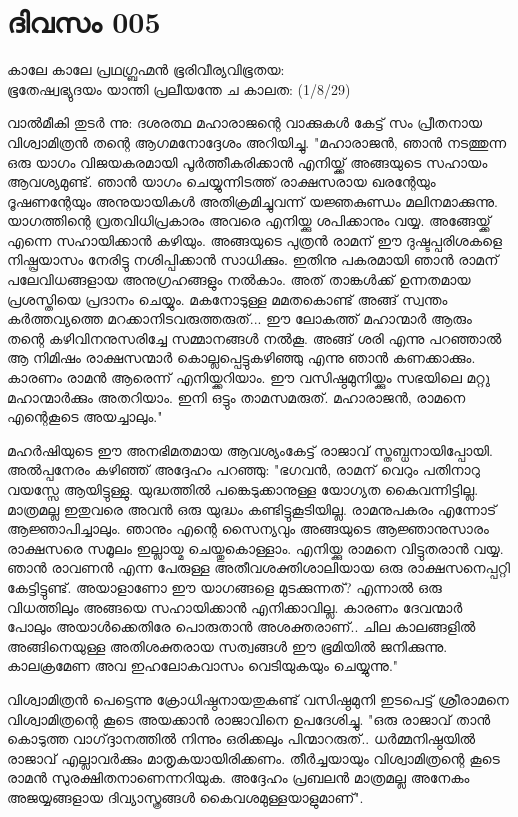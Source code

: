  
\section{ദിവസം 005}

\begin{center}
കാലേ കാലേ പ്രഥഗ്ബ്രഹ്മൻ ഭൂരിവീര്യവിഭൂതയ:\\
ഭൂതേഷ്വഭ്യുദയം യാന്തി പ്രലീയന്തേ ച കാലത:  (1/8/29)\\
\end{center}

വാല്‍മീകി തുടര്‍ ന്നു: ദശരത്ഥ മഹാരാജന്റെ വാക്കുകള്‍ കേട്ട്‌ സം പ്രീതനായ വിശ്വാമിത്രന്‍ തന്റെ ആഗമനോദ്ദേശം അറിയിച്ചു. "മഹാരാജന്‍, ഞാന്‍ നടത്തുന്ന ഒരു യാഗം വിജയകരമായി പൂര്‍ത്തീകരിക്കാന്‍ എനിയ്ക്ക്‌ അങ്ങയുടെ സഹായം ആവശ്യമുണ്ട്‌. ഞാന്‍ യാഗം ചെയ്യുന്നിടത്ത്‌ രാക്ഷസരായ ഖരന്റേയും ദൂഷണന്റേയും അനുയായികള്‍ അതിക്രമിച്ചുവന്ന് യജ്ഞകുണ്ഡം മലിനമാക്കുന്നു. യാഗത്തിന്റെ വ്രതവിധിപ്രകാരം അവരെ എനിയ്ക്കു ശപിക്കാനും വയ്യ. അങ്ങേയ്ക്ക്‌ എന്നെ സഹായിക്കാന്‍ കഴിയും. അങ്ങയുടെ പുത്രന്‍ രാമന്‌ ഈ ദുഷ്ടപ്പരിശകളെ നിഷ്പ്രയാസം നേരിട്ടു നശിപ്പിക്കാന്‍ സാധിക്കും. ഇതിനു പകരമായി ഞാന്‍ രാമന്‌ പലേവിധങ്ങളായ അനുഗ്രഹങ്ങളും നല്‍കാം. അത്‌ താങ്കള്‍ക്ക്‌ ഉന്നതമായ പ്രശസ്തിയെ പ്രദാനം ചെയ്യും. മകനോടുള്ള മമതകൊണ്ട്‌ അങ്ങ്‌ സ്വന്തം കര്‍ത്തവ്യത്തെ മറക്കാനിടവരുത്തരുത്‌... ഈ ലോകത്ത്‌ മഹാന്മാര്‍ ആരും തന്റെ കഴിവിനനുസരിച്ചേ സമ്മാനങ്ങള്‍ നല്‍കൂ. അങ്ങ്‌ ശരി എന്നു പറഞ്ഞാല്‍ ആ നിമിഷം രാക്ഷസന്മാര്‍ കൊല്ലപ്പെട്ടുകഴിഞ്ഞു എന്നു ഞാന്‍ കണക്കാക്കും. കാരണം രാമന്‍ ആരെന്ന് എനിയ്ക്കറിയാം. ഈ വസിഷ്ഠമുനിയ്ക്കും സഭയിലെ മറ്റു മഹാന്മാര്‍ക്കും അതറിയാം. ഇനി ഒട്ടും താമസമരുത്‌. മഹാരാജന്‍, രാമനെ എന്റെകൂടെ അയച്ചാലും."

മഹര്‍ഷിയുടെ ഈ അനഭിമതമായ ആവശ്യംകേട്ട്‌ രാജാവ്‌ സ്തബ്ധനായിപ്പോയി. അല്‍പ്പനേരം കഴിഞ്ഞ്‌ അദ്ദേഹം പറഞ്ഞു: "ഭഗവന്‍, രാമന്‌ വെറും പതിനാറു വയസ്സേ ആയിട്ടുള്ളു. യുദ്ധത്തില്‍ പങ്കെടുക്കാനുള്ള യോഗ്യത കൈവന്നിട്ടില്ല. മാത്രമല്ല ഇതുവരെ അവന്‍ ഒരു യുദ്ധം കണ്ടിട്ടുകൂടിയില്ല. രാമനുപകരം എന്നോട്‌ ആജ്ഞാപിച്ചാലും. ഞാനും എന്റെ സൈന്യവും അങ്ങയുടെ ആജ്ഞാനുസാരം രാക്ഷസരെ സമൂലം ഇല്ലായ്മ ചെയ്തുകൊള്ളാം. എനിയ്ക്കു രാമനെ വിട്ടുതരാന്‍ വയ്യ. ഞാന്‍ രാവണന്‍ എന്ന പേരുള്ള അതീവശക്തിശാലിയായ ഒരു രാക്ഷസനെപ്പറ്റി കേട്ടിട്ടുണ്ട്‌. അയാളാണോ ഈ യാഗങ്ങളെ മുടക്കുന്നത്‌? എന്നാല്‍ ഒരു വിധത്തിലും അങ്ങയെ സഹായിക്കാന്‍ എനിക്കാവില്ല. കാരണം ദേവന്മാര്‍ പോലും അയാള്‍ക്കെതിരേ പൊരുതാന്‍ അശക്തരാണ്‌.. ചില കാലങ്ങളില്‍ അങ്ങിനെയുള്ള അതിശക്തരായ സത്വങ്ങള്‍ ഈ ഭൂമിയില്‍ ജനിക്കുന്നു. കാലക്രമേണ അവ ഇഹലോകവാസം വെടിയുകയും ചെയ്യുന്നു."

വിശ്വാമിത്രന്‍ പെട്ടെന്നു ക്രോധിഷ്ഠനായതുകണ്ട്‌ വസിഷ്ഠമുനി ഇടപെട്ട്‌ ശ്രീരാമനെ വിശ്വാമിത്രന്റെ കൂടെ അയക്കാന്‍ രാജാവിനെ ഉപദേശിച്ചു. "ഒരു രാജാവ്‌ താന്‍ കൊടുത്ത വാഗ്ദ്ദാനത്തില്‍ നിന്നും ഒരിക്കലും പിന്മാറരുത്‌.. ധര്‍മ്മനിഷ്ഠയില്‍ രാജാവ്‌ എല്ലാവര്‍ക്കും മാതൃകയായിരിക്കണം. തീര്‍ച്ചയായും വിശ്വാമിത്രന്റെ കൂടെ രാമന്‍ സുരക്ഷിതനാണെന്നറിയുക. അദ്ദേഹം പ്രബലന്‍ മാത്രമല്ല അനേകം അജയ്യങ്ങളായ ദിവ്യാസ്ത്രങ്ങള്‍ കൈവശമുള്ളയാളുമാണ്‌". 
